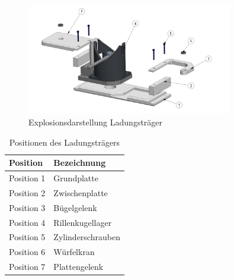 \documentclass[../../main.tex]{subfiles}
\begin{document}
    \begin{figure}[H] %
        \centering
        \includegraphics[width=0.8\textwidth]{ladungstraeger.png}
        \caption{Explosionsdarstellung Ladungsträger}
        \label{fig:expl_ladungstraeger}
    \end{figure}
    \begin{table}[H] \centering
        \begin{tabular}{|l|l|}
        \hline
        \textbf{Position} & \textbf{Bezeichnung}\\
        \hline
        Position 1          & Grundplatte\\
         \hline
        Position 2          & Zwischenplatte\\
        \hline
        Position 3          & Bügelgelenk\\
        \hline
        Position 4          & Rillenkugellager\\
        \hline
        Position 5          & Zylinderschrauben\\
        \hline
        Position 6          & Würfelkran\\
        \hline
        Position 7          & Plattengelenk\\
        \hline
        \end{tabular}

        \caption{Positionen des Ladungsträgers}
        \label{tab:pos_ladungstraeger}
        \end{table}
\end{document}
